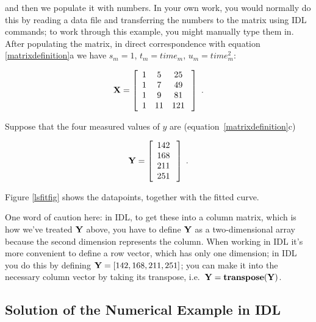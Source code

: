 \documentclass[psfig,preprint]{aastex}
\begin{document}
\noindent and then we populate it with numbers.  In your own work, you
would normally do this by reading a data file and transferring the
numbers to the matrix using IDL commands; to work through this example,
you might manually type them in.  After populating the matrix, in direct
correspondence with equation \ref{matrixdefinition}a we have $s_m = 1$,
$t_m = time_m$, $u_m = time_m^2$:

\begin{mathletters}
\begin{eqnarray}
{\bf X} = \left[
\begin{array}{ccc}
1  &  5   &  25  \\
1  &  7   &  49  \\
1  &  9   &  81  \\
1  &  11  &  121 \\
\end{array} \; \right] \ .
\end{eqnarray}
\end{mathletters}

\noindent Suppose that the four measured values of $y$ are
(equation~\ref{matrixdefinition}c)

\begin{mathletters}
\begin{eqnarray}
{\bf Y} = \left[
\begin{array}{c}
142 \\
168 \\
211 \\
251 \\
\end{array} \; \right] \; .
\end{eqnarray}
\end{mathletters}

\noindent Figure \ref{lsfitfig} shows the datapoints, together with the
fitted curve.

	One word of caution here: in IDL, to get these into a column
matrix, which is how we've treated $\bf Y$ above, you have to define
${\bf Y}$ as a two-dimensional array because the second dimension
represents the column. When working in IDL it's more convenient to 
define a row vector, which has only one dimension; in IDL you do this 
by defining ${\bf Y} = [142,168,211,251]$; you can make it into the
necessary column vector by taking its transpose, i.e.\ ${\bf Y =
transpose(Y)}$. 

	
\subsection{Solution of the Numerical Example in IDL} \label{idlsolution}
\end{document}

